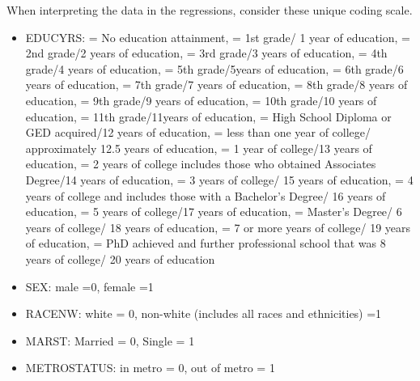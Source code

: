 \documentclass[12pt, English]{article}
\begin{document}
When interpreting the data in the regressions, consider these unique coding scale. 
\begin{itemize}
\item EDUCYRS:  = No education attainment,  = 1st grade/ 1 year of education, = 2nd grade/2 years of education,  = 3rd grade/3 years of education,  = 4th grade/4 years of education,  = 5th grade/5years of education,  = 6th grade/6 years of education,  = 7th grade/7 years of education,   = 8th grade/8 years of education, = 9th grade/9 years of education,  = 10th grade/10 years of education,  = 11th grade/11years of education,  = High School Diploma or GED acquired/12 years of education, = less than one year of college/ approximately 12.5 years of education,  = 1 year of college/13 years of education,  = 2 years of college includes those who obtained Associates Degree/14 years of education,  = 3 years of college/ 15 years of education, = 4 years of college and includes those with a Bachelor’s Degree/ 16 years of education,  = 5 years of college/17 years of education,  = Master’s Degree/ 6 years of college/ 18 years of education, = 7 or more years of college/ 19 years of education,  = PhD achieved and further professional school that was 8 years of college/ 20 years of education 

\item SEX: male =0, female =1

\item RACENW: white = 0, non-white (includes all races and ethnicities) =1

\item MARST: Married = 0, Single = 1 

\item METROSTATUS: in metro = 0, out of metro = 1 


\end{itemize}
\end{document}
